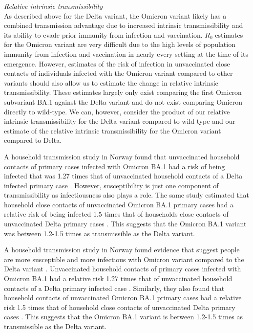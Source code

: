\textit{Relative intrinsic transmissibility}\\
As described above for the Delta variant, the Omicron variant likely has a combined transmission advantage due to increased intrinsic transmissibility and its ability to evade prior immunity from infection and vaccination. 
$R_0$ estimates for the Omicron variant are very difficult due to the high levels of population immunity from infection and vaccination in nearly every setting at the time of its emergence. 
However, estimates of the risk of infection in unvaccinated close contacts of individuals infected with the Omicron variant compared to other variants should 
also allow us to estimate the change in relative intrinsic transmissibility. These estimates largely only exist comparing the first Omicron subvariant BA.1 
against the Delta variant and do not exist comparing Omicron directly to wild-type. 
We can, however, consider the product of our relative intrinsic transmissibility for the Delta variant compared to wild-type and our estimate of the relative 
intrinsic transmissibility for the Omicron variant compared to Delta. 


A household transmission study in Norway found that unvaccinated household contacts of 
primary cases infected with Omicron BA.1 had a risk of being infected that was 1.27 times that of unvaccinated household contacts of a Delta infected primary 
case \cite{jalili2022}. However, susceptibility is just one component of transmissibility as infectiousness also plays a role. 
The same study estimated that household close contacts of unvaccinated Omicron BA.1 primary cases had a relative risk of being infected 1.5 times that of 
households close contacts of unvaccinated Delta primary cases \cite{jalili2022}. This suggests that the Omicron BA.1 variant was between 1.2-1.5 times as 
transmissible as the Delta variant. 

A household transmission study in Norway found evidence that suggest people are more susceptible and more infectious with Omicron variant 
compared to the Delta variant \cite{jalili2022}. Unvaccinated household contacts of primary cases infected with Omicron BA.1 had a relative risk 1.27 
times that of unvaccinated household contacts of a Delta primary infected case \cite{jalili2022}. Similarly, they also found that household contacts of 
unvaccinated Omicron BA.1 primary cases had a relative risk 1.5 times that of household close contacts of unvaccinated Delta primary 
cases \cite{jalili2022}. This suggests that the Omicron BA.1 variant is between 1.2-1.5 times as transmissible as the Delta variant.

